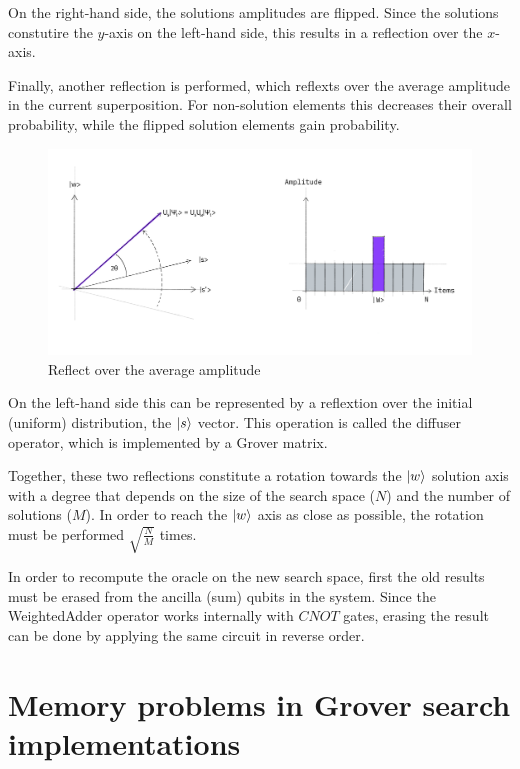 On the right-hand side, the solutions amplitudes are flipped. Since the solutions constutire the $y$-axis on the left-hand side, this results in a reflection over the $x$-axis.

Finally, another reflection is performed, which reflexts over the average amplitude in the current superposition. For non-solution elements this decreases their overall probability, while the flipped solution elements gain probability.
\begin{figure}[H]
  \centering
    \includegraphics[width=\linewidth]{content/assets/03_grovers_algorithm/grover_step3.jpg}
    \caption{Reflect over the average amplitude\cite{GroverQiskitTextbook}}
\end{figure}

On the left-hand side this can be represented by a reflextion over the initial (uniform) distribution, the $\ket{s}$ vector. This operation is called the diffuser operator, which is implemented by a Grover matrix.

Together, these two reflections constitute a rotation towards the $\ket{w}$ solution axis with a degree that depends on the size of the search space ($N$) and the number of solutions ($M$). In order to reach the $\ket{w}$ axis as close as possible, the rotation must be performed $\sqrt{\frac{N}{M}}$ times.

In order to recompute the oracle on the new search space, first the old results must be erased from the ancilla (sum) qubits in the system. Since the WeightedAdder operator works internally with $CNOT$ gates, erasing the result can be done by applying the same circuit in reverse order.

\section{Memory problems in Grover search implementations}


